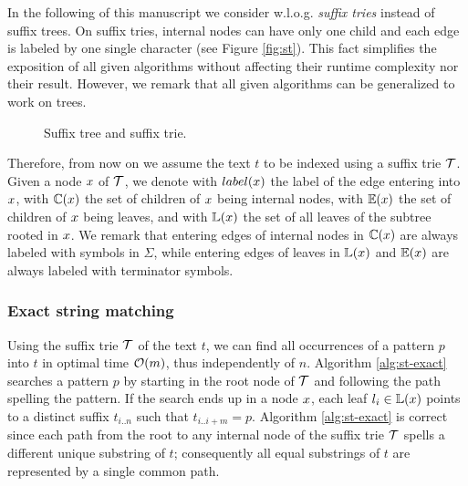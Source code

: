 

In the following of this manuscript we consider w.l.o.g. \emph{suffix tries} instead of suffix trees.
On suffix tries, internal nodes can have only one child and each edge is labeled by one single character (see Figure \ref{fig:st}).
This fact simplifies the exposition of all given algorithms without affecting their runtime complexity nor their result.
However, we remark that all given algorithms can be generalized to work on trees.

\begin{figure}[h]
\caption{Suffix tree and suffix trie.}
\label{fig:stree}
\end{figure}

Therefore, from now on we assume the text $t$ to be indexed using a suffix trie $\mathcal {T}$.
Given a node $x$ of $\mathcal {T}$, we denote with $label(x)$ the label of the edge entering into $x$, with $\mathbb {C}(x)$ the set of children of $x$ being internal nodes, with $\mathbb {E}(x)$ the set of children of $x$ being leaves, and with $\mathbb {L}(x)$ the set of all leaves of the subtree rooted in $x$. We remark that entering edges of internal nodes in $\mathbb {C}(x)$ are always labeled with symbols in $\Sigma$, while entering edges of leaves in $\mathbb {L}(x)$ and $\mathbb {E}(x)$ are always labeled with terminator symbols.

\subsubsection{Exact string matching}

Using the suffix trie $\mathcal {T}$ of the text $t$, we can find all occurrences of a pattern $p$ into $t$ in optimal time $\mathcal{O}(m)$, thus independently of $n$.
Algorithm \ref{alg:st-exact} searches a pattern $p$ by starting in the root node of $\mathcal {T}$ and following the path spelling the pattern.
If the search ends up in a node $x$, each leaf $l_i \in \mathbb {L}(x)$ points to a distinct suffix $t_{i..n}$ such that $t_{i..i+m} = p$.
Algorithm \ref{alg:st-exact} is correct since each path from the root to any internal node of the suffix trie $\mathcal {T}$ spells a different unique substring of $t$; consequently all equal substrings of $t$ are represented by a single common path.

